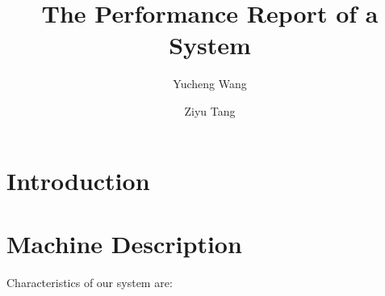 \usepackage{caption}

\usepackage{tikz}
\usepackage{amsmath}

\usepackage{filecontents}



\date{}

\title{\Large \bf The Performance Report of a System}

\author{
{\rm Yucheng Wang}
\and
{\rm Ziyu Tang}
} %

\maketitle

\begin{abstract}

\end{abstract}


\section{Introduction}


\section{Machine Description}
Characteristics of our system are:

